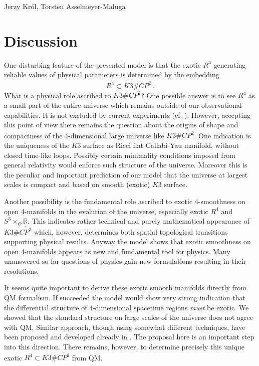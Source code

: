 \begin{artengenv2auth}{Jerzy Kr\'ol, Torsten Asselmeyer-Maluga}
\section{Discussion}
One disturbing feature of the presented model is that the exotic $R^4$ generating reliable values of physical parameters is determined by the embedding 
\[R^4\subset K3\# \overline{CP^2}\,. \] What is a physical role ascribed to $K3\# \overline{CP^2}$? One possible answer is to see $R^4$ as a small part of the entire universe which remains outside of our observational capabilities. It is not excluded by current experiments (cf. \cite{AK2018}). However, accepting this point of view there remains the question about the origins of shape and compactness of the 4-dimensional large universe like $K3\# \overline{CP^2}$. One indication is the uniqueness of the $K3$ surface as Ricci flat Callabi-Yau manifold, without closed time-like loops. Possibly certain minimality conditions imposed from general relativity would enforce such structure of the universe. Moreover this is the peculiar and important prediction of our model that the universe at largest scales is compact and based on smooth (exotic) $K3$ surface.

Another possibility is the fundamental role ascribed to exotic \mbox{4-smoothness} on open 4-manifolds in the evolution of the universe, especially exotic $R^4$ and $S^3\times_{\Theta} \mathbb{R}$. This indicates rather technical and purely mathematical appearance of $K3\# \overline{CP^2}$ which, however, determines both spatial topological transitions supporting physical results. Anyway the model shows that exotic smoothness on open \mbox{4-manifolds} appears as new and fundamental tool for physics. Many unanswered so far questions of physics gain new formulations resulting in their resolutions.

It seems quite important to derive these exotic smooth manifolds directly from QM formalism. If succeeded the model would show very strong indication that the differential structure of 4-dimensional spacetime regions \emph{must} be exotic. We showed that the standard structure on large scales of the universe does not agree with QM. Similar approach, though using somewhat different techniques, have been proposed and developed already in \parencite{JKuniverse17,JK2017a}. 
The proposal here is an important step into this direction. There remains, however, to determine precisely this unique exotic $R^4\subset K3\# \overline{CP^2}$ from QM. 



\end{artengenv2auth}

